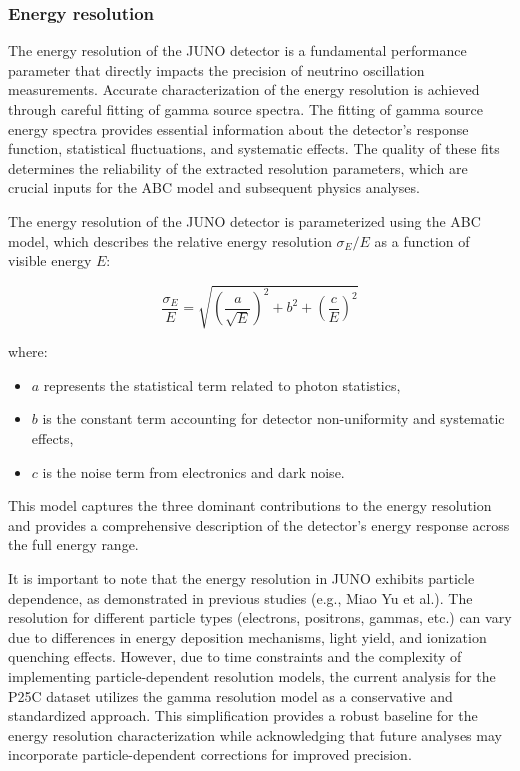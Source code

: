 \subsubsection{Energy resolution}
\label{subsubsection:EReso}
The energy resolution of the JUNO detector is a fundamental performance parameter that directly impacts the precision of neutrino oscillation measurements. Accurate characterization of the energy resolution is achieved through careful fitting of gamma source spectra. The fitting of gamma source energy spectra provides essential information about the detector's response function, statistical fluctuations, and systematic effects. The quality of these fits determines the reliability of the extracted resolution parameters, which are crucial inputs for the ABC model and subsequent physics analyses.


The energy resolution of the JUNO detector is parameterized using the ABC model, which describes the relative energy resolution $\sigma_E/E$ as a function of visible energy $E$:

\begin{equation}
\frac{\sigma_E}{E} = \sqrt{ \left(\frac{a}{\sqrt{E}}\right)^2 + b^2 + \left(\frac{c}{E}\right)^2 }
\label{eq:abc_model}
\end{equation}

where:
\begin{itemize}
    \item $a$ represents the statistical term related to photon statistics,
    \item $b$ is the constant term accounting for detector non-uniformity and systematic effects,
    \item $c$ is the noise term from electronics and dark noise.
\end{itemize}

This model captures the three dominant contributions to the energy resolution and provides a comprehensive description of the detector's energy response across the full energy range.

It is important to note that the energy resolution in JUNO exhibits particle dependence, as demonstrated in previous studies (e.g., Miao Yu et al.). The resolution for different particle types (electrons, positrons, gammas, etc.) can vary due to differences in energy deposition mechanisms, light yield, and ionization quenching effects. However, due to time constraints and the complexity of implementing particle-dependent resolution models, the current analysis for the P25C dataset utilizes the gamma resolution model as a conservative and standardized approach. This simplification provides a robust baseline for the energy resolution characterization while acknowledging that future analyses may incorporate particle-dependent corrections for improved precision.

